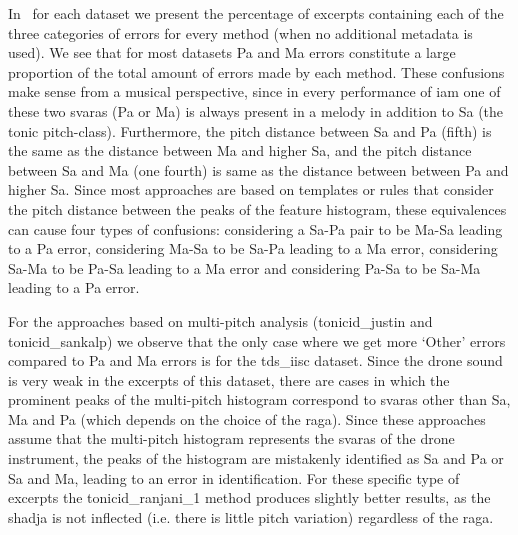 {In~ for each dataset we present the percentage of excerpts containing each of the three categories of errors for every method (when no additional metadata is used). We see that for most datasets Pa and Ma errors constitute a large proportion of the total amount of errors made by each method. These confusions make sense from a musical perspective, since in every performance of \gls{iam} one of these two \glspl{svara} (Pa or Ma) is always present in a melody in addition to Sa (the tonic pitch-class). Furthermore, the pitch distance between Sa and Pa (fifth) is
the same as the distance between Ma and higher Sa, and the pitch distance between Sa and Ma (one fourth) is same as the distance between between Pa and higher Sa. Since most approaches are based on templates or rules that consider the pitch distance between the peaks of the feature histogram, these equivalences can
cause four types of confusions: considering a Sa-Pa pair to be Ma-Sa leading to a Pa error, considering Ma-Sa to be Sa-Pa leading to a Ma error, considering
Sa-Ma to be Pa-Sa leading to a Ma error and considering Pa-Sa to be Sa-Ma leading to a Pa error.

For the approaches based on multi-pitch analysis (\acrshort{tonicid_justin} and \acrshort{tonicid_sankalp}) we observe that the only case where we get more `Other' errors compared to Pa and Ma errors is for the \acrshort{tds_iisc} dataset. Since the drone sound is very weak in the excerpts of this dataset, there are cases in which the prominent peaks of the multi-pitch histogram correspond to \glspl{svara} other than Sa, Ma and Pa (which depends on the choice of the \gls{raga}). Since these approaches assume that the multi-pitch histogram represents the \glspl{svara} of the drone instrument, the peaks of the histogram are mistakenly identified as Sa and Pa or Sa and Ma, leading to an error in identification. For these specific type of excerpts the \acrshort{tonicid_ranjani_1} method produces slightly better results, as the \gls{shadja} is not inflected (i.e. there is little pitch variation) regardless of the \gls{raga}.

}

